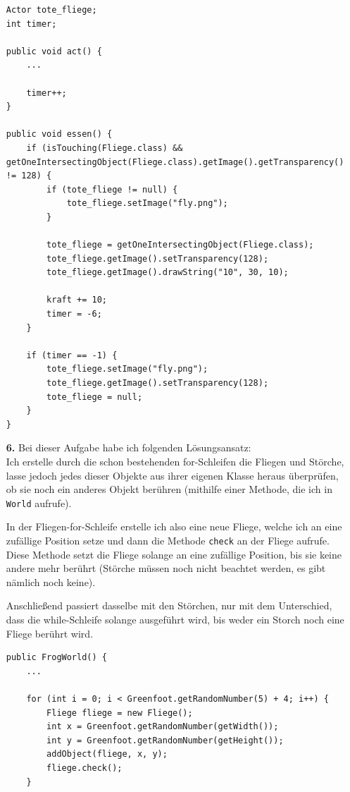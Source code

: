 \documentclass{scrartcl}   %
\begin{document}
\begin{itemize}
    \newpage
    
    \begin{lstlisting}
Actor tote_fliege;
int timer;

public void act() {
    ...
    
    timer++;
}
    
public void essen() {
    if (isTouching(Fliege.class) && getOneIntersectingObject(Fliege.class).getImage().getTransparency() != 128) {
        if (tote_fliege != null) {
            tote_fliege.setImage("fly.png");
        }
        
        tote_fliege = getOneIntersectingObject(Fliege.class);
        tote_fliege.getImage().setTransparency(128);
        tote_fliege.getImage().drawString("10", 30, 10);
        
        kraft += 10;
        timer = -6;
    }
    
    if (timer == -1) {
        tote_fliege.setImage("fly.png");
        tote_fliege.getImage().setTransparency(128);
        tote_fliege = null;
    }
}
    \end{lstlisting}
    \item[\textbf{6.}] Bei dieser Aufgabe habe ich folgenden Lösungsansatz:\\
    Ich erstelle durch die schon bestehenden for-Schleifen die Fliegen und Störche, lasse jedoch jedes dieser Objekte aus ihrer eigenen Klasse heraus überprüfen, ob sie noch ein anderes Objekt berühren (mithilfe einer Methode, die ich in \texttt{World} aufrufe).
    
    In der Fliegen-for-Schleife erstelle ich also eine neue Fliege, welche ich an eine zufällige Position setze und dann die Methode \texttt{check} an der Fliege aufrufe. Diese Methode setzt die Fliege solange an eine zufällige Position, bis sie keine andere mehr berührt (Störche müssen noch nicht beachtet werden, es gibt nämlich noch keine).
    
    Anschließend passiert dasselbe mit den Störchen, nur mit dem Unterschied, dass die while-Schleife solange ausgeführt wird, bis weder ein Storch noch eine Fliege berührt wird.\\
    \begin{lstlisting}
public FrogWorld() {    
    ...
    
    for (int i = 0; i < Greenfoot.getRandomNumber(5) + 4; i++) {
        Fliege fliege = new Fliege();
        int x = Greenfoot.getRandomNumber(getWidth());
        int y = Greenfoot.getRandomNumber(getHeight());
        addObject(fliege, x, y);
        fliege.check();
    }
    

\end{lstlisting}
\end{itemize}
\end{document}
